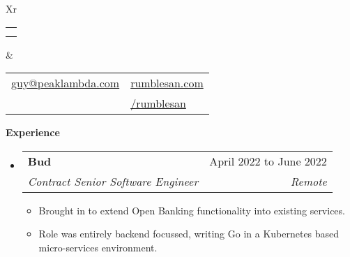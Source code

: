 \documentclass[letterpaper,12pt]{article}[leftmargin=*]
\makeatletter
\def \fullname {David Guy John}
\def \subtitle {}
\def \phoneicon {\faPhone}
\def \phonetext {07531 668 965}
\def \emailicon {\faEnvelope}
\def \emaillink {mailto:guy@peaklambda.com}
\def \emailtext {guy@peaklambda.com}
\def \githubicon {\faGithub}
\def \githublink {https://github.com/rumblesan}
\def \githubtext {/rumblesan}
\def \websiteicon {\faGlobe}
\def \websitelink {https://rumblesan.com/}
\def \websitetext {rumblesan.com}
\def \entryspacing {-0pt}
\def \phone {\phoneicon \hspace{3pt}{ \phonetext}}
\def \email {\emailicon \hspace{3pt}\href{\emaillink}{\emailtext}}
\def \github {\githubicon \hspace{3pt}\href{\githublink}{\githubtext}}
\def \website {\websiteicon \hspace{3pt}\href{\websitelink}{\websitetext}}
\renewcommand{\section}[2]{\vspace{5pt}
  \colorbox{secondary}{\color{white}\raggedbottom\normalsize{#1}{\hspace{7pt}\textbf{#2}}}
}
\newenvironment{resumeEntry}[0]{
  \begin{itemize}[leftmargin=2.5mm]
  }{
  \end{itemize}\vspace{\entryspacing}
}
\newenvironment{resumeItemList}[0]{
  \begin{itemize}[leftmargin=4.5mm]
  }{
  \end{itemize}
}
\newcommand{\resumeItem}[1]{
  \item\small{
    {#1 \vspace{-2pt}}
  }
}
\newcommand{\resumeEntryTSDL}[4]{
  \vspace{-1pt}\item[]
    \begin{tabularx}{0.97\textwidth}{X@{\hspace{60pt}}r}
      \textbf{\color{primary}#1} & {\firabook\color{accent}\small#2} \\
      \textit{\color{accent}\small#3} & \textit{\color{accent}\small#4} \\
    \end{tabularx}\vspace{-6pt}
}
\newcommand{\cvHeader}[4]{
  \begin{tabularx}{\textwidth}{Xr}
    {
      \begin{tabular}{l}
        \fontsize{35}{45}\selectfont{\color{primary}{{\textbf{\fullname}}}} \\
        {\textit{\subtitle}}
      \end{tabular}
    } & {
      \begin{tabular}{l@{\hspace{1.5em}}l}
        {\small#1} & {\small#3} \\
        {\small#2} & {\small#4}
      \end{tabular}
    }
  \end{tabularx}
}
\makeatother
\begin{document}


\cvHeader{\email}{\phone}{\website}{\github} %
\vspace{-10pt} %




\section{\faPieChart}{Experience}

  \begin{resumeEntry}
    \resumeEntryTSDL{Bud}{April 2022 to June 2022}
      {Contract Senior Software Engineer}{Remote}
    \begin{resumeItemList}
      \resumeItem{Brought in to extend Open Banking functionality into existing services.}
      \resumeItem{Role was entirely backend focussed, writing Go in a Kubernetes based micro-services environment.}
    \end{resumeItemList}
  \end{resumeEntry}
\end{document}
